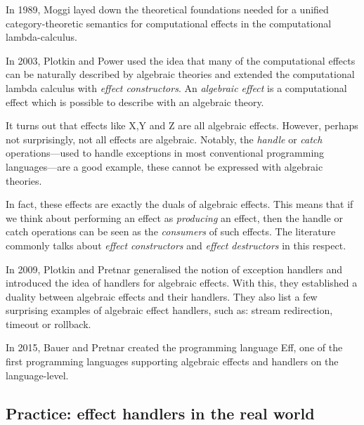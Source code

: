 \documentclass[class=article,crop=false,11pt]{standalone}
\begin{document}
In 1989, Moggi \cite{moggi1989computational,moggi1990abstract} layed down the theoretical foundations
needed for a unified category-theoretic semantics for computational effects in the computational lambda-calculus.

In 2003, Plotkin and Power \cite{plotkin2003algebraic} used the idea that many of the computational effects
can be naturally described by algebraic theories and extended the computational lambda calculus with \emph{effect constructors}.
An \emph{algebraic effect} is a computational effect which is possible to describe with an algebraic theory.

It turns out that effects like X,Y and Z are all algebraic effects. However, perhaps not surprisingly, not all
effects are algebraic. Notably, the \emph{handle} or \emph{catch} operations---used to handle exceptions in
most conventional programming languages---are a good example, these cannot be expressed with algebraic theories.

In fact, these effects are exactly the duals of algebraic effects. This means that
if we think about performing an effect as \emph{producing} an effect, then the handle or
catch operations can be seen as the \emph{consumers} of such effects. The literature commonly talks
about \emph{effect constructors} and \emph{effect destructors} in this respect.


In 2009, Plotkin and Pretnar \cite{plotkin2009handlers} generalised the notion of exception handlers and introduced the idea of handlers for algebraic effects.
With this, they established a duality between algebraic effects and their handlers. 
They also list a few surprising examples of algebraic effect handlers, such as: stream redirection, timeout or rollback.

In 2015, Bauer and Pretnar \cite{bauer2015programming} created the programming language Eff, one of the first programming languages supporting algebraic effects and
handlers on the language-level.

\subsection{Practice: effect handlers in the real world}
\end{document}
